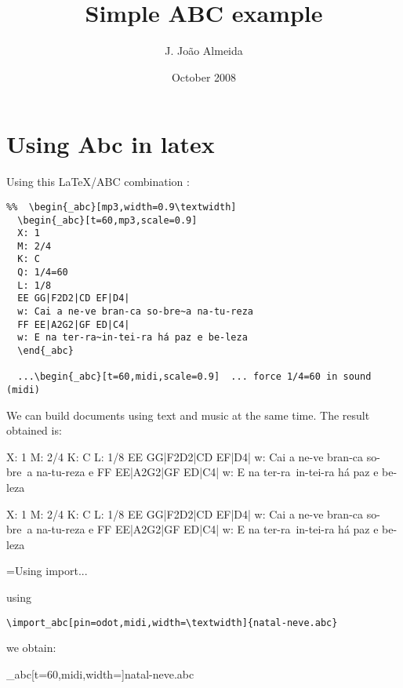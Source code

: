 \documentclass{article}
\begin{document}
\title{Simple ABC example}
\author{J. João Almeida}
\date{October 2008}
\maketitle

\tableofcontents

\newpage

\section{Using Abc in latex}

Using this LaTeX/ABC combination :
\begin{verbatim}
%%  \begin{_abc}[mp3,width=0.9\textwidth]
  \begin{_abc}[t=60,mp3,scale=0.9]
  X: 1
  M: 2/4
  K: C
  Q: 1/4=60
  L: 1/8
  EE GG|F2D2|CD EF|D4|
  w: Cai a ne-ve bran-ca so-bre~a na-tu-reza 
  FF EE|A2G2|GF ED|C4|
  w: E na ter-ra~in-tei-ra há paz e be-leza
  \end{_abc}

  ...\begin{_abc}[t=60,midi,scale=0.9]  ... force 1/4=60 in sound (midi)
\end{verbatim}


We can build documents using text and music at the same time.
The result obtained is:

\begin{_abc}[incipit,t=120,mp3,scale=0.9]
X: 1
M: 2/4
K: C
L: 1/8
EE GG|F2D2|CD EF|D4|
w: Cai a ne-ve bran-ca so-bre~a na-tu-reza e
FF EE|A2G2|GF ED|C4|
w: E na ter-ra~in-tei-ra há paz e be-leza
\end{_abc}

\begin{_abc}[incipit,t=120,mp3,scale=0.9]
X: 1
M: 2/4
K: C
L: 1/8
EE GG|F2D2|CD EF|D4|
w: Cai a ne-ve bran-ca so-bre~a na-tu-reza e
FF EE|A2G2|GF ED|C4|
w: E na ter-ra~in-tei-ra há paz e be-leza
\end{_abc}

=Using import...

using 
\begin{verbatim}
\import_abc[pin=odot,midi,width=\textwidth]{natal-neve.abc}
\end{verbatim}
we obtain:

\import_abc[t=60,midi,width=\textwidth]{natal-neve.abc}
\end{document}
